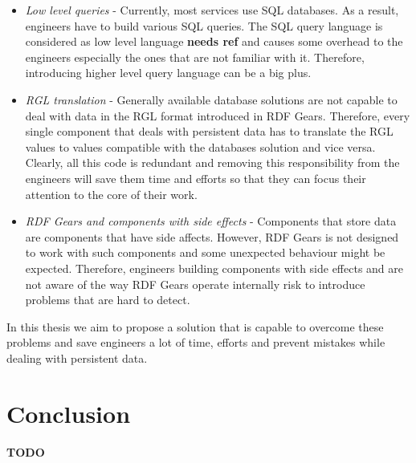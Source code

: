 \begin{itemize}
	\item \textit{Low level queries} - Currently, most services use SQL databases. As a result, engineers have to build various SQL queries. The SQL query language is considered as low level language \textbf{needs ref} and causes some overhead to the engineers especially the ones that are not familiar with it. Therefore, introducing higher level query language can be a big plus.
	
	\item \textit{RGL translation} - Generally available database solutions are not capable to deal with data in the RGL format introduced in RDF Gears. Therefore, every single component that deals with persistent data has to translate the RGL values to values compatible with the databases solution and vice versa. Clearly, all this code is redundant and removing this responsibility from the engineers will save them time and efforts so that they can focus their attention to the core of their work.
	
	\item \textit{RDF Gears and components with side effects} - Components that store data are components that have side affects. However, RDF Gears is not designed to work with such components and some unexpected behaviour might be expected. Therefore, engineers building components with side effects and are not aware of the way RDF Gears operate internally risk to introduce problems that are hard to detect.
	
\end{itemize}

In this thesis we aim to propose a solution that is capable to overcome these problems and save engineers a lot of time, efforts and prevent mistakes while dealing with persistent data.

\section{Conclusion}

\textbf{TODO}
